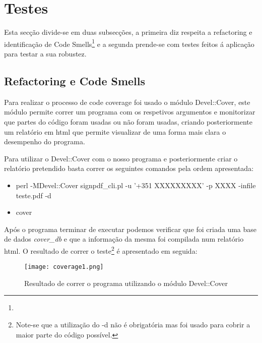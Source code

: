\section{Testes}

\par Esta secção divide-se em duas subsecções, a primeira diz respeita a refactoring e identificação de Code Smells\footnote{} e a segunda prende-se com testes feitos á aplicação para testar a sua robustez.

\subsection{Refactoring e Code Smells}

\par Para realizar o processo de code coverage foi usado o módulo Devel::Cover, este módulo permite correr um programa com os respetivos argumentos e monitorizar que partes do código foram usadas ou não foram usadas, criando posteriormente um relatório em html que permite visualizar de uma forma mais clara o desempenho do programa.
\par Para utilizar o Devel::Cover com o nosso programa e posteriormente criar o relatório pretendido basta correr os seguintes comandos pela ordem apresentada:
\begin{itemize}
	\item perl -MDevel::Cover signpdf\_cli.pl -u '+351 XXXXXXXXX' -p XXXX -infile teste.pdf -d
	\item cover
\end{itemize}

Após o programa terminar de executar podemos verificar que foi criada uma base de dados \textit{cover\_db} e que a informação da mesma foi compilada num relatório html.
O resultado de correr o teste\footnote{Note-se que a utilização do -d não é obrigatória mas foi usado para cobrir a maior parte do código possível.} é apresentado em seguida:

\begin{figure}[H]

  \centering
  \captionsetup{justification=centering}

  \texttt{[image: coverage1.png]}
  
  \caption {Resultado de correr o programa utilizando o módulo Devel::Cover}

\end{figure}


